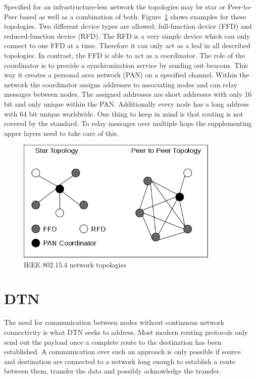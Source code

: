 Specified for an infrastructure-less network the topologies may be star or
Peer-to-Peer based as well as a combination of both. Figure~\ref{fig:802154topologies}
shows examples for these topologies. Two different device types are allowed:
full-function device (FFD) and reduced-function device (RFD). The RFD is a very
simple device which can only connect to one FFD at a time. Therefore it can only
act as a leaf in all described topologies. In contrast, the FFD is able to act
as a coordinator. The role of the coordinator is to provide a synchronization
service by sending out beacons. This way it creates a personal area network
(PAN) on a specified channel. Within the network the coordinator assigns
addresses to associating nodes and can relay messages between nodes. The
assigned addresses are short addresses with only 16 bit and only unique within
the PAN. Additionally every node has a long address with 64 bit unique worldwide.
One thing to keep in mind is that routing is not covered by the standard. To
relay messages over multiple hops the supplementing upper layers need to take
care of this.

\begin{figure}
  \begin{center}
    \includegraphics[height=6cm]{images/802154topology}
    \caption{IEEE 802.15.4 network topologies}
        \label{fig:802154topologies}
  \end{center}
\end{figure}

\section{DTN}
\label{introdtn}
The need for communication between nodes without continuous network
connectivity is what DTN seeks to address. Most modern routing protocols only
send out the payload once a complete route to the destination has been established.
A communication over such an approach is only possible if source and destination
are connected to a network long enough to establish a route between them,
transfer the data and possibly acknowledge the transfer.

